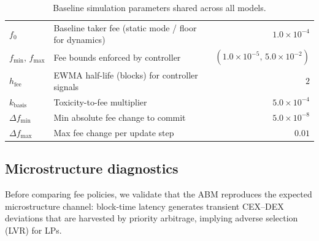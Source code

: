 \documentclass[11pt]{article}
\begin{document}
\begin{table}[!htbp]
\begin{tabularx}{\textwidth}{|l|X|r|}
\rowcolor{groupgray}\multicolumn{3}{|l|}{\textbf{Fee controller}}\\
\hline
\(f_0\) & Baseline taker fee (static mode / floor for dynamics) & \(1.0\times10^{-4}\) \\
\hline
\(f_{\min},\,f_{\max}\) & Fee bounds enforced by controller & \((1.0\times10^{-5},\,5.0\times10^{-2})\) \\
\hline
\(h_{\text{fee}}\) & EWMA half-life (blocks) for controller signals & \(2\) \\
\hline
\(k_{\text{basis}}\) & Toxicity-to-fee multiplier & \(5.0\times10^{-4}\) \\
\hline
\(\Delta f_{\min}\) & Min absolute fee change to commit & \(5.0\times10^{-8}\) \\
\hline
\(\Delta f_{\max}\) & Max fee change per update step & \(0.01\) \\
\hline
\end{tabularx}
\caption{Baseline simulation parameters shared across all models.}
\label{tab:common_params}
\end{table}

\FloatBarrier
\subsection{Microstructure diagnostics}
\label{sec:stylized}
Before comparing fee policies, we validate that the ABM reproduces the expected microstructure channel: block-time 
latency generates transient CEX--DEX deviations that are harvested by priority arbitrage, implying adverse selection (LVR) for LPs.
\end{document}
